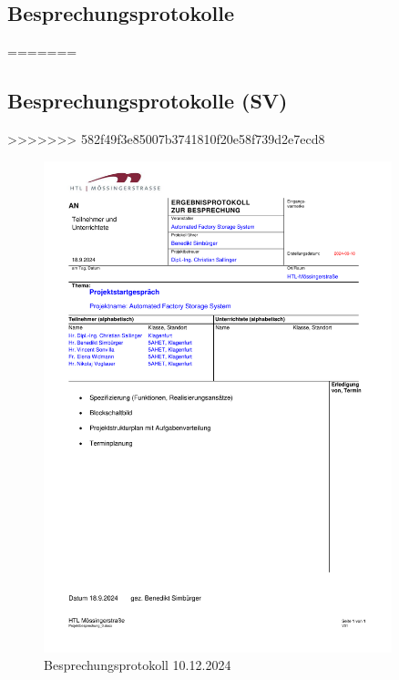 \subsection{Besprechungsprotokolle}
=======
\subsection{Besprechungsprotokolle (SV)}
>>>>>>> 582f49f3e85007b3741810f20e58f739d2e7ecd8
\begin{figure}[H]
    \includegraphics[width=0.9\textwidth]{../Protokolls/Projektbesprechung_0.pdf}
    \centering
    \caption{Besprechungsprotokoll 10.12.2024}
\end{figure}

